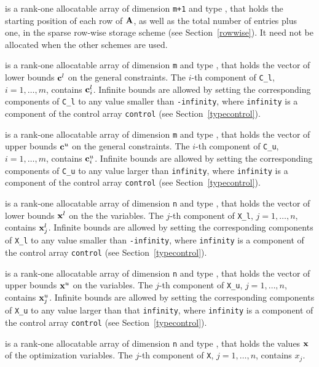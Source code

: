 \documentclass{galahad}
\begin{document}
\begin{description}
\begin{description}
 is a rank-one allocatable array of dimension {\tt m+1} and type 
\integer, that holds the 
starting position of each row of ${\mathbf{A}}$, as well
as the total number of entries plus one, in the sparse row-wise storage
scheme (see Section~\ref{rowwise}). It need not be allocated when the
other schemes are used.

\end{description}

 is a rank-one allocatable array of dimension {\tt m} and type 
\realdp, that holds the vector of lower bounds ${\mathbf{c}}^{l}$ 
on the general constraints. The $i$-th component of 
{\tt C\_l}, $i = 1, \ldots , m$, contains ${\mathbf{c}}_{i}^{l}$.
Infinite bounds are allowed by setting the corresponding 
components of {\tt C\_l} to any value smaller than {\tt -infinity}, 
where {\tt infinity} is a component of the control array {\tt control} 
(see Section~\ref{typecontrol}).

 is a rank-one allocatable array of dimension {\tt m} and type 
\realdp, that holds the vector of upper bounds ${\mathbf{c}}^{u}$ 
on the general constraints. The $i$-th component of 
{\tt C\_u}, $i = 1,  \ldots ,  m$, contains ${\mathbf{c}}_{i}^{u}$.
Infinite bounds are allowed by setting the corresponding 
components of {\tt C\_u} to any value larger than {\tt infinity}, 
where {\tt infinity} is a component of the control array {\tt control} 
(see Section~\ref{typecontrol}).

 is a rank-one allocatable array of dimension {\tt n} and type 
\realdp, that holds
the vector of lower bounds ${\mathbf{x}}^{l}$ on the the variables.
The $j$-th component of {\tt X\_l}, $j = 1, \ldots , n$, 
contains ${\mathbf{x}}_{j}^{l}$.
Infinite bounds are allowed by setting the corresponding 
components of {\tt X\_l} to any value smaller than {\tt -infinity}, 
where {\tt infinity} is a component of the control array {\tt control} 
(see Section~\ref{typecontrol}).

 is a rank-one allocatable array of dimension {\tt n} and type 
\realdp, that holds
the vector of upper bounds ${\mathbf{x}}^{u}$ on the variables.
The $j$-th component of {\tt X\_u}, $j = 1, \ldots , n$, 
contains ${\mathbf{x}}_{j}^{u}$.
Infinite bounds are allowed by setting the corresponding 
components of {\tt X\_u} to any value larger than that {\tt infinity}, 
where {\tt infinity} is a component of the control array {\tt control} 
(see Section~\ref{typecontrol}).

 is a rank-one allocatable array of dimension {\tt n} and type 
\realdp, 
that holds the values ${\mathbf{x}}$ of the optimization variables.
The $j$-th component of {\tt X}, $j = 1,  \ldots , n$, contains $x_{j}$.  


\end{description}
\end{document}
